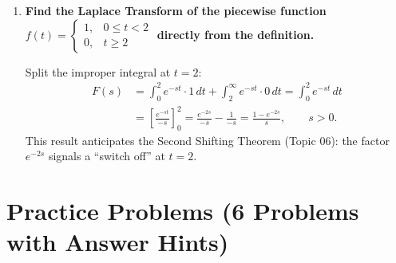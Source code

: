 \documentclass[12pt,a4paper]{article}
\begin{document}
\begin{enumerate}[leftmargin=1.5em, label=\textbf{D\arabic*.}]
\item \textbf{Find the Laplace Transform of the piecewise function $f(t) = \begin{cases} 1, & 0 \leq t < 2 \\ 0, & t \geq 2 \end{cases}$ directly from the definition.}

Split the improper integral at $t = 2$:
\begin{align*}
F(s) &= \int_0^{2} e^{-st}\cdot 1\,dt + \int_2^{\infty} e^{-st}\cdot 0\,dt
  = \int_0^{2} e^{-st}\,dt \\
  &= \left[\frac{e^{-st}}{-s}\right]_0^{2}
  = \frac{e^{-2s}}{-s} - \frac{1}{-s}
  = \frac{1 - e^{-2s}}{s}, \qquad s > 0.
\end{align*}
This result anticipates the Second Shifting Theorem (Topic 06): the factor $e^{-2s}$ signals a ``switch off'' at $t = 2$.

\end{enumerate}

\section{Practice Problems (6 Problems with Answer Hints)}
\end{document}
